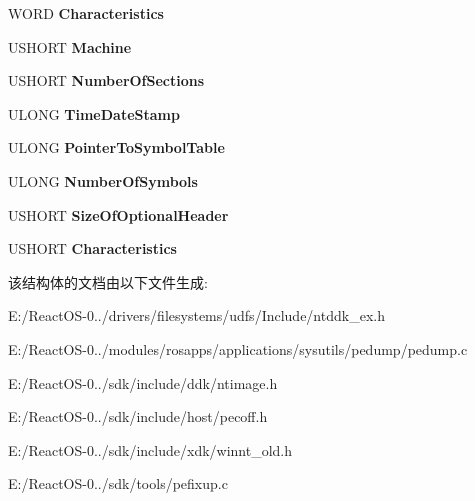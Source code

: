 \begin{DoxyCompactItemize}
W\+O\+RD {\bfseries Characteristics}
\item 
\mbox{\label{struct___i_m_a_g_e___f_i_l_e___h_e_a_d_e_r_ab5a3b8b61f389dde3dcbef0c6e7f3677}} 
U\+S\+H\+O\+RT {\bfseries Machine}
\item 
\mbox{\label{struct___i_m_a_g_e___f_i_l_e___h_e_a_d_e_r_a1d7c5ecf80afe8fcde5b58132adc30e0}} 
U\+S\+H\+O\+RT {\bfseries Number\+Of\+Sections}
\item 
\mbox{\label{struct___i_m_a_g_e___f_i_l_e___h_e_a_d_e_r_ae01e1af8c5dd6e974965da09b982516b}} 
U\+L\+O\+NG {\bfseries Time\+Date\+Stamp}
\item 
\mbox{\label{struct___i_m_a_g_e___f_i_l_e___h_e_a_d_e_r_a96dde435f79254e53a327bd7e425c511}} 
U\+L\+O\+NG {\bfseries Pointer\+To\+Symbol\+Table}
\item 
\mbox{\label{struct___i_m_a_g_e___f_i_l_e___h_e_a_d_e_r_a057655158e6750ef0741b73b654c9370}} 
U\+L\+O\+NG {\bfseries Number\+Of\+Symbols}
\item 
\mbox{\label{struct___i_m_a_g_e___f_i_l_e___h_e_a_d_e_r_a193681aff66b90b61ff5acc5a37d0e05}} 
U\+S\+H\+O\+RT {\bfseries Size\+Of\+Optional\+Header}
\item 
\mbox{\label{struct___i_m_a_g_e___f_i_l_e___h_e_a_d_e_r_ac158e1d16579a98323455350c6e4437c}} 
U\+S\+H\+O\+RT {\bfseries Characteristics}
\end{DoxyCompactItemize}


该结构体的文档由以下文件生成\+:\begin{DoxyCompactItemize}
\item 
E\+:/\+React\+O\+S-\/0../drivers/filesystems/udfs/\+Include/ntddk\+\_\+ex.\+h\item 
E\+:/\+React\+O\+S-\/0../modules/rosapps/applications/sysutils/pedump/pedump.\+c\item 
E\+:/\+React\+O\+S-\/0../sdk/include/ddk/ntimage.\+h\item 
E\+:/\+React\+O\+S-\/0../sdk/include/host/pecoff.\+h\item 
E\+:/\+React\+O\+S-\/0../sdk/include/xdk/winnt\+\_\+old.\+h\item 
E\+:/\+React\+O\+S-\/0../sdk/tools/pefixup.\+c\end{DoxyCompactItemize}
